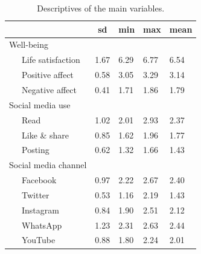 \documentclass[
  man,mask]{apa7}
\begin{document}
\begin{table}[tbp]

\begin{center}
\begin{threeparttable}

\caption{\label{tab:tab-descriptives}Descriptives of the main variables.}

\begin{tabular}{lllll}
\toprule
 & \multicolumn{1}{c}{sd} & \multicolumn{1}{c}{min} & \multicolumn{1}{c}{max} & \multicolumn{1}{c}{mean}\\
\midrule
Well-being &  &  &  & \\
\ \ \ Life satisfaction & 1.67 & 6.29 & 6.77 & 6.54\\
\ \ \ Positive affect & 0.58 & 3.05 & 3.29 & 3.14\\
\ \ \ Negative affect & 0.41 & 1.71 & 1.86 & 1.79\\
Social media use &  &  &  & \\
\ \ \ Read & 1.02 & 2.01 & 2.93 & 2.37\\
\ \ \ Like \& share & 0.85 & 1.62 & 1.96 & 1.77\\
\ \ \ Posting & 0.62 & 1.32 & 1.66 & 1.43\\
Social media channel &  &  &  & \\
\ \ \ Facebook & 0.97 & 2.22 & 2.67 & 2.40\\
\ \ \ Twitter & 0.53 & 1.16 & 2.19 & 1.43\\
\ \ \ Instagram & 0.84 & 1.90 & 2.51 & 2.12\\
\ \ \ WhatsApp & 1.23 & 2.31 & 2.63 & 2.44\\
\ \ \ YouTube & 0.88 & 1.80 & 2.24 & 2.01\\
\bottomrule
\end{tabular}

\end{threeparttable}
\end{center}

\end{table}

\newpage
\end{document}
